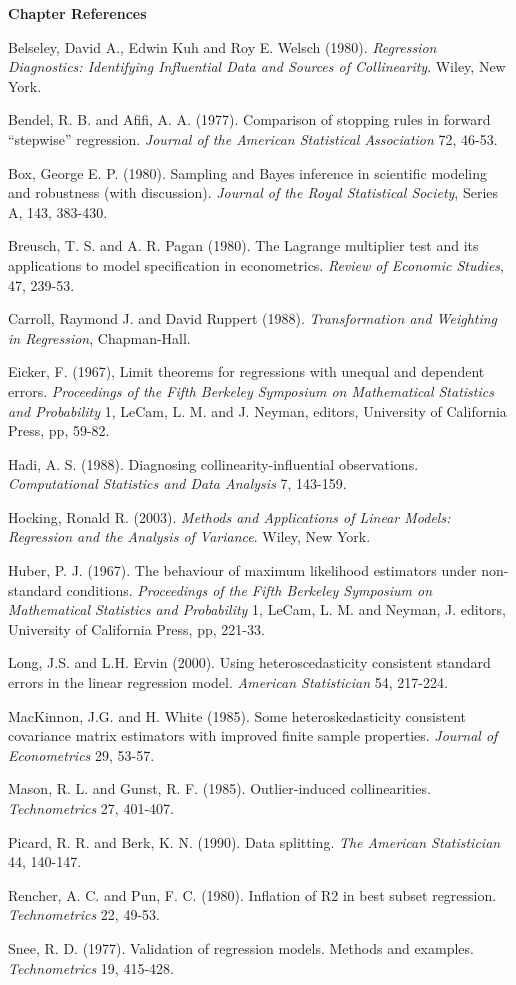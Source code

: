 \textbf{Chapter References}
\begin{multicols}{2}

Belseley, David A., Edwin Kuh and Roy E. Welsch (1980).
\textit{Regression Diagnostics: Identifying Influential Data and
Sources of Collinearity}. Wiley, New York.

Bendel, R. B. and Afifi, A. A. (1977). Comparison of stopping rules
in forward ``stepwise'' regression. \textit{Journal of the American
Statistical Association} 72, 46-53.

Box, George E. P. (1980). Sampling and Bayes inference in scientific
modeling and robustness (with discussion). \textit{Journal of the
Royal Statistical Society}, Series A, 143, 383-430.

Breusch, T. S. and A. R. Pagan (1980).  The Lagrange multiplier test
and its applications to model specification in econometrics.
\textit{Review of Economic Studies}, 47, 239-53.

Carroll, Raymond J. and David Ruppert (1988). \textit{Transformation
and Weighting in Regression}, Chapman-Hall.

Eicker, F. (1967), Limit theorems for regressions with unequal and
dependent errors.  \textit{Proceedings of the Fifth Berkeley
Symposium on Mathematical Statistics and Probability} 1, LeCam, L.
M. and J. Neyman, editors, University of California Press, pp,
59-82.

Hadi, A. S. (1988). Diagnosing collinearity-influential
observations. \textit{Computational Statistics and Data Analysis} 7,
143-159.

Hocking, Ronald R. (2003). \textit{Methods and Applications of
Linear Models: Regression and the Analysis of Variance}. Wiley, New
York.

Huber, P. J. (1967). The behaviour of maximum likelihood estimators
under non-standard conditions. \textit{Proceedings of the Fifth
Berkeley Symposium on Mathematical Statistics and Probability} 1,
LeCam, L. M. and Neyman, J. editors, University of California Press,
pp, 221-33.

Long, J.S. and L.H. Ervin (2000). Using heteroscedasticity
consistent standard errors in the linear regression model.
\textit{American Statistician} 54, 217-224.

MacKinnon, J.G. and H. White (1985). Some heteroskedasticity
consistent covariance matrix estimators with improved finite sample
properties. \textit{Journal of Econometrics} 29, 53-57.

Mason, R. L. and Gunst, R. F. (1985). Outlier-induced
collinearities. \textit{Technometrics} 27, 401-407.

Picard, R. R. and Berk, K. N. (1990). Data splitting. \textit{The
American Statistician} 44, 140-147.

Rencher, A. C. and Pun, F. C. (1980). Inflation of R2 in best subset
regression. \textit{Technometrics} 22, 49-53.

Snee, R. D. (1977). Validation of regression models. Methods and
examples. \textit{Technometrics} 19, 415-428.


\end{multicols}


